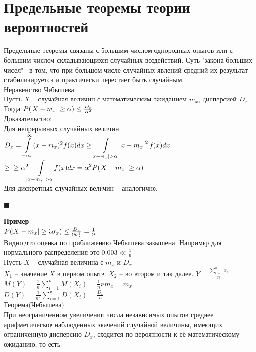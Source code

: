 \documentclass[russian, 12pt, fleqn]{article}
\begin{document}
\section{Предельные теоремы теории вероятностей}
\noindent
Предельные теоремы связаны с большим числом однородных опытов или с большим числом складывающихся случайных воздействий. Суть "закона больших чисел"  \ в том, что при большом числе случайных явлений средний их результат стабилизируется и практически перестает быть случайным.\\
\underline{Неравенство Чебышева}\\
Пусть $X$ -- случайная величин с математическим ожиданием $m_x$, дисперсией $D_x$.\\
Тогда $P(\abs{X - m_x} \geq \alpha) \leq \frac{D_x}{\alpha^2}$\\
\underline{Доказательство:}\\
Для непрерывных случайных величин. \\
$D_x =  \displaystyle{\int\limits_{-\infty}^{\infty} }(x-m_x)^2 f(x) dx \geq \displaystyle{\int\limits_{\abs{x - m_x} > \alpha} } \abs{x-m_x}^2 f(x) dx$
$\geq  \\ \geq \alpha^2  \displaystyle{\int\limits_{\abs{x - m_x} > \alpha} }f(x) dx = \alpha^2 P(\abs{X - m_x} \geq \alpha)$ \\
Для дискретных случайных величин -- аналогично.\\
\begin{flushright}\(\blacksquare\)\end{flushright}
\textbf{Пример} \\
$P(\abs{X - m_x} \geq  3 \sigma_x) \leq  \frac{D_x}{9\sigma_x^2} = \frac{1}{9}$\\
Видно,что оценка по  приближению Чебышева  завышена.  Например для нормального распределения это $0.003 \ll \frac{1}{9}$\\
Пусть $X$ -- случайная величина с $m_x$  и $D_x$\\
$X_1$ -- значение $X$ в первом опыте. $X_2$ -- во втором и так далее. $Y = \frac{\displaystyle{\sum\limits_{i = 1}  ^ {n} x_i}}{n}$ $M(Y) = \frac{1}{n} \displaystyle{\sum\limits_{i = 1}^{n}} M(X_i) = \frac{1}{n} n m_x = m_x$\\
$D(Y)  = \frac{1}{n^2}\displaystyle{\sum\limits_{i = 1}^{n}} D(X_i) = \frac{D_x}{n}$\\
$\textbf{Теорема(Чебышева)}$\\
При неограниченном увеличении числа независимых опытов  среднее \\ арифметическое наблюденных значений случайной величины, имеющих ограниченную дисперсию $D_x$, сходится по вероятности к её математическому ожиданию, то есть
\end{document}

